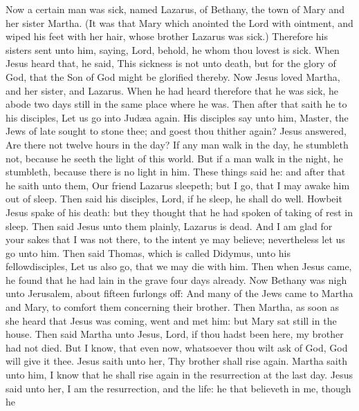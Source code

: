  Now a certain man was sick, named Lazarus, of Bethany, the
town of Mary and her sister Martha.  (It was that Mary which
anointed the Lord with ointment, and wiped his feet with her hair, whose
brother Lazarus was sick.)  Therefore his sisters sent unto
him, saying, Lord, behold, he whom thou lovest is sick. 
When Jesus heard that, he said, This sickness is not unto death, but for
the glory of God, that the Son of God might be glorified thereby.
 Now Jesus loved Martha, and her sister, and Lazarus.
 When he had heard therefore that he was sick, he abode two
days still in the same place where he was.  Then after that
saith he to his disciples, Let us go into Judæa again.  His
disciples say unto him, Master, the Jews of late sought to stone thee;
and goest thou thither again?  Jesus answered, Are there not
twelve hours in the day? If any man walk in the day, he stumbleth not,
because he seeth the light of this world.  But if a man
walk in the night, he stumbleth, because there is no light in him.
 These things said he: and after that he saith unto them,
Our friend Lazarus sleepeth; but I go, that I may awake him out of
sleep.  Then said his disciples, Lord, if he sleep, he
shall do well.  Howbeit Jesus spake of his death: but they
thought that he had spoken of taking of rest in sleep. 
Then said Jesus unto them plainly, Lazarus is dead.  And I
am glad for your sakes that I was not there, to the intent ye may
believe; nevertheless let us go unto him.  Then said
Thomas, which is called Didymus, unto his fellowdisciples, Let us also
go, that we may die with him.  Then when Jesus came, he
found that he had lain in the grave four days already.  Now
Bethany was nigh unto Jerusalem, about fifteen furlongs off:
 And many of the Jews came to Martha and Mary, to comfort
them concerning their brother.  Then Martha, as soon as she
heard that Jesus was coming, went and met him: but Mary sat still in the
house.  Then said Martha unto Jesus, Lord, if thou hadst
been here, my brother had not died.  But I know, that even
now, whatsoever thou wilt ask of God, God will give it thee.
 Jesus saith unto her, Thy brother shall rise again.
 Martha saith unto him, I know that he shall rise again in
the resurrection at the last day.  Jesus said unto her, I
am the resurrection, and the life: he that believeth in me, though he
